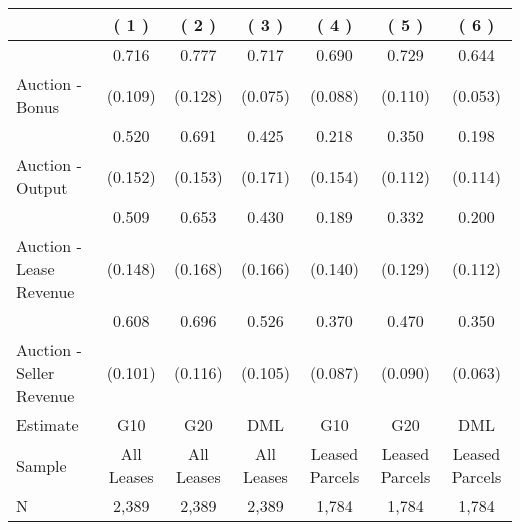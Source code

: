 
\begin{tabular}{lcccccc}
\toprule
  & ( 1 ) & ( 2 ) & ( 3 ) & ( 4 ) & ( 5 ) & ( 6 )\\
\midrule
 & 0.716 & 0.777 & 0.717 & 0.690 & 0.729 & 0.644\\

\multirow{-2}{*}{\raggedright\arraybackslash Auction - Bonus} & (0.109) & (0.128) & (0.075) & (0.088) & (0.110) & (0.053)\\

\midrule
 & 0.520 & 0.691 & 0.425 & 0.218 & 0.350 & 0.198\\

\multirow{-2}{*}{\raggedright\arraybackslash Auction - Output} & (0.152) & (0.153) & (0.171) & (0.154) & (0.112) & (0.114)\\

\midrule
 & 0.509 & 0.653 & 0.430 & 0.189 & 0.332 & 0.200\\

\multirow{-2}{*}{\raggedright\arraybackslash Auction - Lease Revenue} & (0.148) & (0.168) & (0.166) & (0.140) & (0.129) & (0.112)\\

\midrule
 & 0.608 & 0.696 & 0.526 & 0.370 & 0.470 & 0.350\\

\multirow{-2}{*}{\raggedright\arraybackslash Auction - Seller Revenue} & (0.101) & (0.116) & (0.105) & (0.087) & (0.090) & (0.063)\\

\midrule
Estimate & G10 & G20 & DML & G10 & G20 & DML\\

Sample & All Leases & All Leases & All Leases & Leased Parcels & Leased Parcels & Leased Parcels\\

N & 2,389 & 2,389 & 2,389 & 1,784 & 1,784 & 1,784\\
\bottomrule
\end{tabular}
